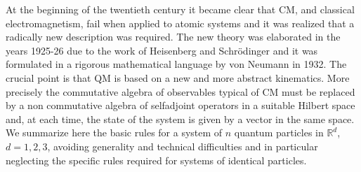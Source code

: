 \documentclass[12pt,reqno]{amsart}
\newcommand{\erre}{\mathbb{R}}
\newcommand{\n}{\relax}
\newcommand{\vs}{\medskip}
\numberwithin{equation}{section}
\begin{document}
\n
At the beginning of the twentieth century it became clear that CM, and classical electromagnetism, fail when applied to atomic systems and it was realized that a radically new description was required. The new theory was elaborated in the years 1925-26 due to the work of Heisenberg and Schr\"{o}dinger and  it was formulated in a rigorous mathematical language by von Neumann in 1932. 
The crucial point is that QM is based on a new and more abstract kinematics. 
More precisely the commutative algebra of observables typical of CM must be replaced by a non commutative algebra of selfadjoint operators in a suitable Hilbert space and, at each time,   
the state of the system is given by  a vector in the same space. 
We summarize here the basic rules for a system of $n$ quantum particles in $\erre^d$, $d=1,2,3$, avoiding  generality and technical difficulties  and in particular neglecting the specific rules required for systems of identical particles.

\vs
\end{document}
